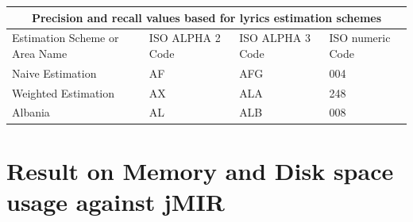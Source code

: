 \begin{tabular}{ |p{4cm}||p{3cm}|p{3cm}|p{3cm}|  }
 \hline
 \multicolumn{4}{|c|}{Precision and recall values based for lyrics estimation schemes} \\
 \hline
 Estimation Scheme     or Area Name& ISO ALPHA 2 Code &ISO ALPHA 3 Code&ISO numeric Code\\
 \hline
 Naive Estimation   & AF    &AFG&   004\\
 Weighted Estimation &   AX  & ALA   &248\\
 Albania &AL & ALB&  008\\
 \hline 
\end{tabular}

\section{Result on Memory and Disk space usage against jMIR}

